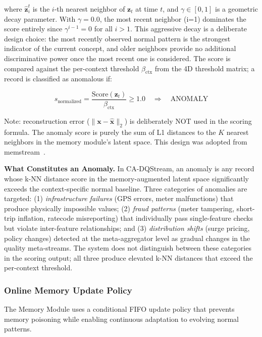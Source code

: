 where $\hat{\mathbf{z}}_i^t$ is the $i$-th nearest neighbor of $\mathbf{z}_t$ at time $t$, and $\gamma \in [0, 1]$ is a geometric decay parameter. With $\gamma = 0.0$, the most recent neighbor (i=1) dominates the score entirely since $\gamma^{i-1} = 0$ for all $i > 1$. This aggressive decay is a deliberate design choice: the most recently observed normal pattern is the strongest indicator of the current concept, and older neighbors provide no additional discriminative power once the most recent one is considered. The score is compared against the per-context threshold $\beta_{\text{ctx}}$ from the 4D threshold matrix; a record is classified as anomalous if:

\begin{equation}
s_{\text{normalized}} = \frac{\text{Score}(\mathbf{z}_t)}{\beta_{\text{ctx}}} \geq 1.0
\quad \Longrightarrow \quad \text{ANOMALY}
\label{eq:anomaly_decision}
\end{equation}

Note: reconstruction error ($\|\mathbf{x} - \hat{\mathbf{x}}\|_2$) is deliberately NOT used in the scoring formula. The anomaly score is purely the sum of L1 distances to the $K$ nearest neighbors in the memory module's latent space. This design was adopted from memstream~\citep{bhatia2022memstream}.

\textbf{What Constitutes an Anomaly.} In CA-DQStream, an anomaly is any record whose k-NN distance score in the memory-augmented latent space significantly exceeds the context-specific normal baseline. Three categories of anomalies are targeted: (1) \textit{infrastructure failures} (GPS errors, meter malfunctions) that produce physically impossible values; (2) \textit{fraud patterns} (meter tampering, short-trip inflation, ratecode misreporting) that individually pass single-feature checks but violate inter-feature relationships; and (3) \textit{distribution shifts} (surge pricing, policy changes) detected at the meta-aggregator level as gradual changes in the quality meta-streams. The system does not distinguish between these categories in the scoring output; all three produce elevated k-NN distances that exceed the per-context threshold.

\subsubsection{Online Memory Update Policy}

The Memory Module uses a conditional FIFO update policy that prevents memory poisoning while enabling continuous adaptation to evolving normal patterns.

